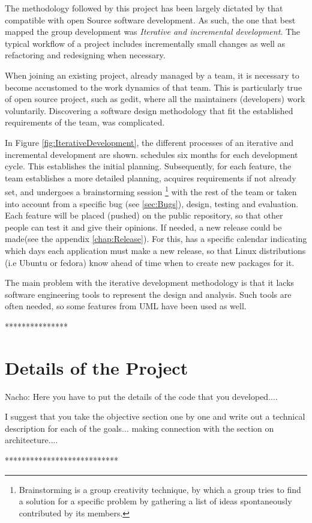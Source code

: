 The methodology followed by this project has been largely dictated by that compatible 
with open Source software development.    As such, the one that best mapped the group 
development was  \emph{Iterative and incremental development}. 
The typical workflow of a  \GNOME project includes incrementally small changes 
as well as refactoring and redesigning when necessary.  



When joining an existing project, already managed by a team, it is necessary to become accustomed 
to the work dynamics of that team. This is particularly true of open source project, such as gedit, 
where all the maintainers (developers) work voluntarily.  Discovering a software design methodology 
that fit the established requirements of the team, was complicated.  






In Figure \ref{fig:IterativeDevelopment}, the different processes of an iterative and incremental 
development are shown.  \GNOME schedules six months for each development cycle. This establishes the initial planning. 
Subsequently, for each feature, the team establishes a more detailed planning, acquires requirements if not already set, 
and undergoes a brainstorming session \footnote{Brainstorming is a group creativity technique, by which a group tries to find a 
solution for a specific problem by gathering a list of ideas spontaneously contributed by its members.} with the 
rest of the team or taken into account from a specific bug (see \ref{sec:Bugs}), design, testing and evaluation. 
Each feature will be placed (pushed) on the public repository,  so that other people can test it and give their opinions. 
If needed, a new release could be made(see the appendix \ref{chap:Release}).  For this, \GNOME has a specific calendar indicating 
which days each application must make a new release, so that Linux distributions (i.e Ubuntu or fedora) 
know ahead of time when to create new packages for it.

The main problem with the iterative development methodology is that it lacks software engineering tools 
to represent the design and analysis.  Such tools are often needed, so some features from UML have been used as well.





***************\section{Details of the Project}


Nacho:  Here you have to put the details of the code that you developed....


I suggest that you take the objective section one by one and write out 
a technical description for each of the goals... making connection with the 
section on architecture....


***************************






